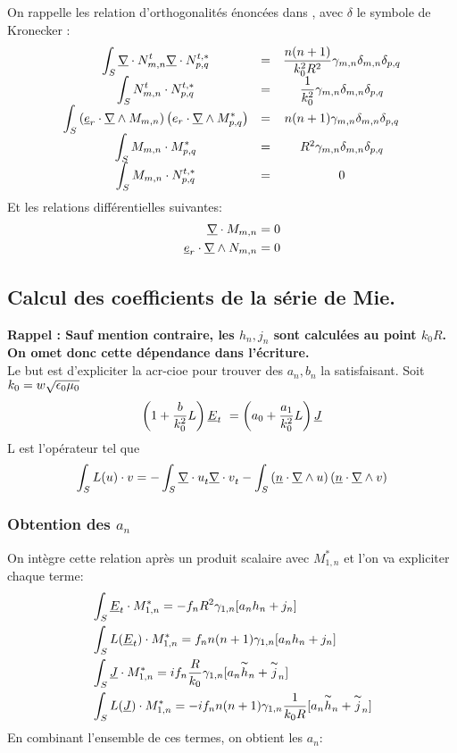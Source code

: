 On rappelle les relation d'orthogonalités énoncées dans \cite{marceaux_high-order_2000}, avec $\delta$ le symbole de Kronecker :
\[
  \begin{matrix}
    \displaystyle\int_S \underline{\nabla} \cdot N_{m,n}^t \underline{\nabla} \cdot N_{p,q}^{t,*} &=& \dfrac{n(n+1)}{k_0^2 R^2} \gamma_{m,n} \delta_{m,n} \delta_{p,q}\\
    \displaystyle\int_S N_{m,n}^t \cdot N_{p,q}^{t,*} &=& \dfrac{1}{k_0^2}\gamma_{m,n}\delta_{m,n} \delta_{p,q}\\
    \displaystyle\int_S \left(\underline{e}_r \cdot \underline{\nabla} \wedge M_{m,n}\right)\left( e_r \cdot \underline{\nabla} \wedge  M_{p,q}^{*}\right) &=& n(n+1) \gamma_{m,n} \delta_{m,n} \delta_{p,q}\\
    \displaystyle\int_S M_{m,n} \cdot M_{p,q}^{*} &=& R^2 \gamma_{m,n} \delta_{m,n} \delta_{p,q}\\
    \displaystyle\int_S M_{m,n} \cdot N_{p,q}^{t,*} &=& 0
  \end{matrix}
\]
Et les relations différentielles suivantes:
\begin{align*}
  \underline{\nabla} \cdot M_{m,n} &=0 \\
  \underline{e}_r \cdot \underline{\nabla} \wedge N_{m,n} &= 0
\end{align*}

\subsection{Calcul des coefficients de la série de Mie.}
\textbf{Rappel : Sauf mention contraire, les $h_n,j_n$ sont calculées au point $k_0R$. On omet donc cette dépendance dans l'écriture.}\\
Le but est d'expliciter la \gls{acr-cioe} pour trouver des $a_n, b_n$ la satisfaisant.
Soit $k_0 = w\sqrt{\epsilon_0\mu_0}$
\begin{equation}
  \label{eq_CIOE} \left(1+\dfrac{b}{k_0^2}L\right)\underline{E}_t\ = \left(a_0 + \dfrac{a_1}{k_0^2}L\right)\underline{J}
\end{equation}
L est l'opérateur tel que 
\[
  \int_{S} L(u)\cdot v = - \int_{S} {\underline{\nabla} \cdot u}_t {\underline{\nabla} \cdot v}_t - \int_{S}\left(\underline{n} \cdot \underline{\nabla} \wedge u\right)\left( \underline{n} \cdot \underline{\nabla} \wedge v\right)
\]
\subsubsection{Obtention des $a_n$}
On intègre cette relation après un produit scalaire avec $M_{1,n}^{*}$ et l'on va expliciter chaque terme:
\begin{align*}
  &\int_S \underline{E}_t\cdot M_{1,n}^{*} = - f_n R^2 \gamma_{1,n}[a_n h_n + j_n]\\
  &\int_S L(\underline{E}_t)\cdot M_{1,n}^{*} =  f_n n(n+1)\gamma_{1,n}[a_n h_n + j_n]\\
  &\int_S \underline{J} \cdot M_{1,n}^{*} =  i f_n \dfrac{R}{k_0} \gamma_{1,n}[a_n \overset{\thicksim}{h}_n + \overset{\thicksim}{j}_n]\\
  &\int_S L(\underline{J}) \cdot M_{1,n}^{*} =  - i f_n n(n+1) \gamma_{1,n}\dfrac{1}{k_0 R}[a_n \overset{\thicksim}{h}_n + \overset{\thicksim}{j}_n]\\
\end{align*}
En combinant l'ensemble de ces termes, on obtient les $a_n$:

